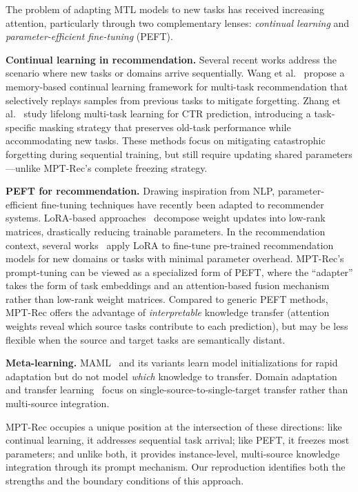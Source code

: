 \documentclass[review,anonymous]{acmart}
\begin{document}
The problem of adapting MTL models to new tasks has received increasing attention,
particularly through two complementary lenses: \emph{continual learning} and
\emph{parameter-efficient fine-tuning} (PEFT).

\textbf{Continual learning in recommendation.} Several recent works address the
scenario where new tasks or domains arrive sequentially. Wang et
al.~\cite{wang2024continual} propose a memory-based continual learning framework
for multi-task recommendation that selectively replays samples from previous
tasks to mitigate forgetting. Zhang et al.~\cite{zhang2024lifelong} study
lifelong multi-task learning for CTR prediction, introducing a task-specific
masking strategy that preserves old-task performance while accommodating new
tasks. These methods focus on mitigating catastrophic forgetting during
sequential training, but still require updating shared parameters---unlike
MPT-Rec's complete freezing strategy.

\textbf{PEFT for recommendation.} Drawing inspiration from NLP, parameter-efficient
fine-tuning techniques have recently been adapted to recommender systems.
LoRA-based approaches~\cite{hu2021lora} decompose weight updates into low-rank
matrices, drastically reducing trainable parameters. In the recommendation
context, several works~\cite{zhang2024peftrec,wang2024lorarec} apply LoRA to
fine-tune pre-trained recommendation models for new domains or tasks with
minimal parameter overhead. MPT-Rec's prompt-tuning can be viewed as a
specialized form of PEFT, where the ``adapter'' takes the form of task embeddings
and an attention-based fusion mechanism rather than low-rank weight matrices.
Compared to generic PEFT methods, MPT-Rec offers the advantage of
\emph{interpretable} knowledge transfer (attention weights reveal which source
tasks contribute to each prediction), but may be less flexible when the source
and target tasks are semantically distant.

\textbf{Meta-learning.} MAML~\cite{finn2017model} and its variants learn model
initializations for rapid adaptation but do not model \emph{which} knowledge to
transfer. Domain adaptation and transfer learning~\cite{pan2009survey,
weiss2016survey,zhuang2020comprehensive} focus on single-source-to-single-target
transfer rather than multi-source integration.

MPT-Rec occupies a unique position at the intersection of these directions:
like continual learning, it addresses sequential task arrival; like PEFT, it
freezes most parameters; and unlike both, it provides instance-level, multi-source
knowledge integration through its prompt mechanism. Our reproduction identifies
both the strengths and the boundary conditions of this approach.
\end{document}
